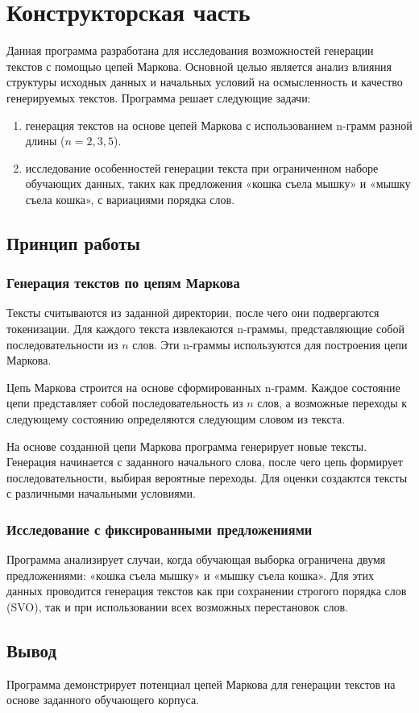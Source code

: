 \chapter{Конструкторская часть}

Данная программа разработана для исследования возможностей генерации текстов с помощью цепей Маркова. 
Основной целью является анализ влияния структуры исходных данных и начальных условий на осмысленность и качество генерируемых текстов. 
Программа решает следующие задачи:
\begin{enumerate}
    \item генерация текстов на основе цепей Маркова с использованием n-грамм разной длины (\(n = 2, 3, 5\)).
    \item исследование особенностей генерации текста при ограниченном наборе обучающих данных, 
    таких как предложения «кошка съела мышку» и «мышку съела кошка», с вариациями порядка слов.
\end{enumerate}

\section{Принцип работы}

\subsection{Генерация текстов по цепям Маркова}
Тексты считываются из заданной директории, после чего они подвергаются токенизации. 
Для каждого текста извлекаются n-граммы, представляющие собой последовательности из \(n\) слов. 
Эти n-граммы используются для построения цепи Маркова.

Цепь Маркова строится на основе сформированных n-грамм. 
Каждое состояние цепи представляет собой последовательность из \(n\) слов,
 а возможные переходы к следующему состоянию определяются следующим словом из текста.

На основе созданной цепи Маркова программа генерирует новые тексты. 
Генерация начинается с заданного начального слова, после чего цепь формирует последовательности, выбирая вероятные переходы. 
Для оценки создаются тексты с различными начальными условиями.

\subsection{Исследование с фиксированными предложениями}
Программа анализирует случаи, когда обучающая выборка ограничена двумя предложениями: 
«кошка съела мышку» и «мышку съела кошка». 
Для этих данных проводится генерация текстов как при сохранении строгого порядка слов (SVO), так и при использовании всех возможных перестановок слов.

\section*{Вывод}
Программа демонстрирует потенциал цепей Маркова для генерации текстов на основе заданного обучающего корпуса. 

\clearpage
